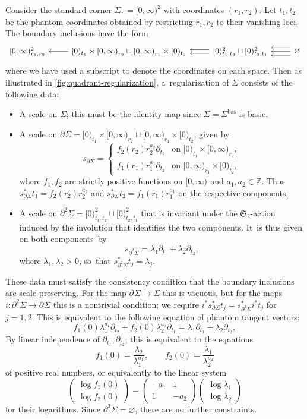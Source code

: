 \documentclass[10pt]{amsart}
\theoremstyle{definition}
\theoremstyle{remark}
\newenvironment{example}
  {\pushQED{\qed}\renewcommand{\qedsymbol}{$\lozenge$}\examplex}
  {\popQED\endexamplex}
\newcommand{\ZZ}{\mathbb{Z}}
\newcommand{\halfspc}[1]{[0,\infty)^{#1}}
\newcommand{\defas}{\mathrel{\mathop:}=}
\newcommand{\cvf}[1]{\partial_{#1}}
\newcommand{\Sig}{\Sigma}
\newcommand{\bas}[1]{{#1}^{\mathrm{bas}}}
\newcommand{\Sigbas}{\bas{\Sig}}
\newcommand{\bdSig}[1][]{\partial^{#1}\Sigma}
\newcommand{\symgp}[1]{\mathfrak{S}_{#1}}
\newcommand{\augsimpshort}[4]
{
\begin{tikzcd}[ampersand replacement=\&]
     #1 \& #2 \ar[l] \& #3
     \ar[l,shift left = 1]\ar[l,shift right=1] \& \ar[l,shift left = 2]\ar[l,shift left = 0]\ar[l,shift left = -2]  #4
    \end{tikzcd}
}
\begin{document}
\begin{example}
Consider the standard corner $\Sig \defas \halfspc{2}$ with coordinates $(r_1,r_2)$. Let $t_1,t_2$ be the phantom coordinates obtained by restricting $r_1,r_2$ to their vanishing loci. The boundary inclusions have the form
\[
\augsimpshort{\halfspc{2}_{r_1,r_2}}{{[0)_{t_1}\times\halfspc{}_{r_2} \sqcup \halfspc{}_{r_1}\times[0)_{t_2}}}
{{[0)^2_{t_1,t_2} \sqcup [0)^2_{t_2,t_1}}}{\varnothing}
\]
where we have used a subscript to denote the coordinates on each space. Then as illustrated in \autoref{fig:quadrant-regularization}, a~regularization of $\Sig$ consists of the following data:
\begin{itemize}
\item A scale on $\Sig$; this must be the identity map since $\Sig=\Sigbas$ is basic.
\item A scale on $\bdSig = {[0)_{t_1}\times\halfspc{}_{r_2} \sqcup \halfspc{}_{r_1}\times[0)_{t_2}}$, given by
\[
s_{\bdSig} = \begin{cases}
f_2(r_2)r_2^{a_2}\cvf{t_1} & \textrm{on }[0)_{t_1} \times \halfspc{}_{r_2}, \\
f_1(r_1)r_1^{a_1}\cvf{t_2} & \textrm{on }[0,\infty)_{r_1}\times [0)_{t_2},
\end{cases}
\]
where $f_1,f_2$ are strictly positive functions on $\halfspc{}$ and $a_1,a_2 \in \ZZ$. Thus $s_{\bdSig}^* t_1 = f_2(r_2) r_2^{a_2}$ and $s_{\bdSig}^*t_2 = f_1(r_1) r_1^{a_1}$ on the respective components.
\item A scale on $\bdSig[2] = [0)^2_{t_1,t_2} \sqcup [0)^2_{t_2,t_1}$ that is invariant under the $\symgp{2}$-action induced by the involution that identifies the two components. It~is thus given on both components~by
\[
s_{\bdSig[2]} = \lambda_1 \cvf{t_1} + \lambda_2 \cvf{t_2},
\]
where $\lambda_1,\lambda_2 > 0$, so~that $s_{\bdSig[2]}^*t_j = \lambda_j$.
\end{itemize}
These data must satisfy the consistency condition that the boundary inclusions are scale-preserving. For the map $\bdSig \to \Sig$ this is vacuous, but for the maps $i \colon \bdSig[2]\to\bdSig$ this is a nontrivial condition; we require $i^*s_{\bdSig}^*t_j = s_{\bdSig[2]}^*i^*t_j$ for $j=1,2$. This is equivalent to the following equation of phantom tangent vectors:
\[
f_1(0) \lambda_1^{a_1}\cvf{t_2} + f_2(0)\lambda_2^{a_2}\cvf{t_1} = \lambda_1 \cvf{t_1} + \lambda_2 \cvf{t_2},
\]
By linear independence of $\cvf{t_1},\cvf{t_2}$, this is equivalent to the equations
\[
f_1(0) = \frac{\lambda_2}{\lambda_1^{a_1}},\qquad
f_2(0) = \frac{\lambda_1}{\lambda_2^{a_2}}
\]
of positive real numbers, or equivalently to the linear system
\[
\begin{pmatrix}
\log f_1(0) \\ \log f_2(0)
\end{pmatrix} = \begin{pmatrix}
-a_1 & 1 \\
1 & -a_2
\end{pmatrix}\begin{pmatrix}
\log \lambda_1 \\
\log \lambda_2
\end{pmatrix}
\]
for their logarithms. Since $\bdSig[3]=\varnothing$, there are no further constraints.


\end{example}
\end{document}
